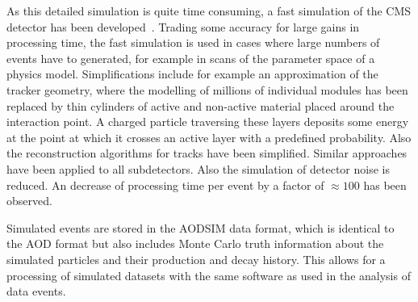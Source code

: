 As this detailed simulation is quite time consuming, a fast simulation of the CMS detector has been developed~\cite{1742-6596-331-3-032049}. Trading some accuracy for large gains in processing time, the fast simulation is used in cases where large numbers of events have to generated, for example in scans of the parameter space of a physics model. Simplifications include for example an approximation of the tracker geometry, where the modelling of millions of individual modules has been replaced by thin cylinders of active and non-active material placed around the interaction point. A charged particle traversing these layers deposits some energy at the point at which it crosses an active layer with a predefined probability. Also the reconstruction algorithms for tracks have been simplified. Similar approaches have been applied to all subdetectors. Also the simulation of detector noise is reduced. An decrease of processing time per event by a factor of $\approx100$ has been observed. 

Simulated events are stored in the AODSIM data format, which is identical to the AOD format but also includes Monte Carlo truth information about the simulated particles and their production and decay history. This allows for a processing of simulated datasets with the same software as used in the analysis of data events. 

